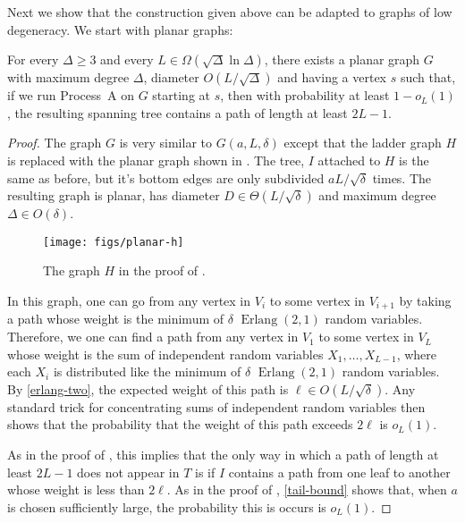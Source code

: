 \documentclass[lotsofwhite]{patmorin}
\DeclareMathOperator{\erlang}{Erlang}
\begin{document}
Next we show that the construction given above can be adapted to graphs
of low degeneracy.  We start with planar graphs:

\begin{thm}
  For every $\Delta\ge 3$ and every $L\in\Omega(\sqrt{\Delta}\ln\Delta)$,
  there exists a planar graph $G$ with maximum degree $\Delta$, diameter
  $O(L/\sqrt{\Delta})$ and having a vertex $s$ such that, if we run
  Process~A on $G$ starting at $s$, then with probability at least
  $1-o_L(1)$, the resulting spanning tree contains a path of length at
  least $2L-1$.
\end{thm}

\begin{proof}
  The graph $G$ is very similar to $G(a, L,\delta)$ except that the ladder
  graph $H$ is replaced with the planar graph shown in .
  The tree, $I$ attached to $H$ is the same as before, but it's bottom
  edges are only subdivided $aL/\sqrt{\delta}$ times.  The resulting
  graph is planar, has diameter $D\in\Theta(L/\sqrt{\delta})$ and maximum
  degree $\Delta\in O(\delta)$.

  \begin{figure}
    \begin{center}
      \texttt{[image: figs/planar-h]}
    \end{center}
    \caption{The graph $H$ in the proof of .}
  \end{figure}
 
  In this graph, one can go from any vertex in $V_i$ to some vertex in
  $V_{i+1}$ by taking a path whose weight is the minimum of $\delta$
  $\erlang(2,1)$ random variables.   Therefore, we one can find a path
  from any vertex in $V_1$ to some vertex in $V_L$ whose weight is the
  sum of independent random variables $X_1,\ldots,X_{L-1}$, where each
  $X_i$ is distributed like the minimum of $\delta$ $\erlang(2,1)$
  random variables.  By \eqref{erlang-two}, the expected weight of
  this path is $\ell \in O(L/\sqrt{\delta})$.  Any standard trick for
  concentrating sums of independent random variables then shows that the
  probability that the weight of this path exceeds $2\ell$ is $o_L(1)$.

  As in the proof of , this implies
  that the only way in which a path of length at least $2L-1$ does not
  appear in $T$ is if $I$ contains a path from one leaf to another whose
  weight is less than $2\ell$.  As in the proof of ,
  \eqref{tail-bound} shows that, when $a$ is chosen sufficiently large,
  the probability this is occurs is $o_L(1)$.
\end{proof}
\end{document}
